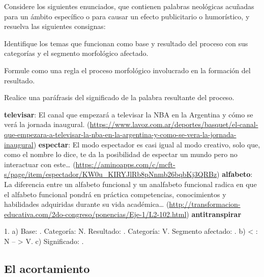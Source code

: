 \begin{ejercicio}\label{ej:04-regresiva}
Considere los siguientes enunciados, que contienen palabras neológicas acuñadas
para un ámbito específico o para causar un efecto publicitario o humorístico, y
resuelva las siguientes consignas:

\begin{consignas}
  \item Identifique los temas que funcionan como base y resultado del proceso
        con sus categorías y el segmento morfológico afectado.
  \item Formule como una regla el proceso morfológico involucrado en la
        formación del resultado.
  \item Realice una paráfrasis del significado de la palabra resultante del
        proceso.
\end{consignas}

\begin{exe}
  \ex \textbf{televisar}: El canal que empezará a televisar la NBA en la
      Argentina y cómo se verá la jornada inaugural.
      (\url{https://www.lavoz.com.ar/deportes/basquet/el-canal-que-empezara-a-televisar-la-nba-en-la-argentina-y-como-se-vera-la-jornada-inaugural})
  \ex \textbf{espectar}: El modo espectador es casi igual al modo creativo,
      solo que, como el nombre lo dice, te da la posibilidad de espectar un mundo
      pero no interactuar con este\ldots{}
      (\url{https://aminoapps.com/c/mcft-s/page/item/espectador/KW0u_KIRYJlRb8pNnmb26bqbKj3QRBz})
  \ex \textbf{alfabeto}: La diferencia entre un alfabeto funcional y un
      analfabeto funcional radica en que el alfabeto funcional pondrá en
      práctica competencias, conocimientos y habilidades adquiridas durante su
      vida académica\ldots{}
      (\url{http://transformacion-educativa.com/2do-congreso/ponencias/Eje-1/L2-102.html})
  \ex \textbf{antitranspirar}
\end{exe}

\begin{resuelto}
1. a) Base: . Categoría: N. Resultado: .
Categoría: V. Segmento afectado: . b)  <
: N --  > V. c) Significado: .
\end{resuelto}
\end{ejercicio}

\subsection{El acortamiento}

